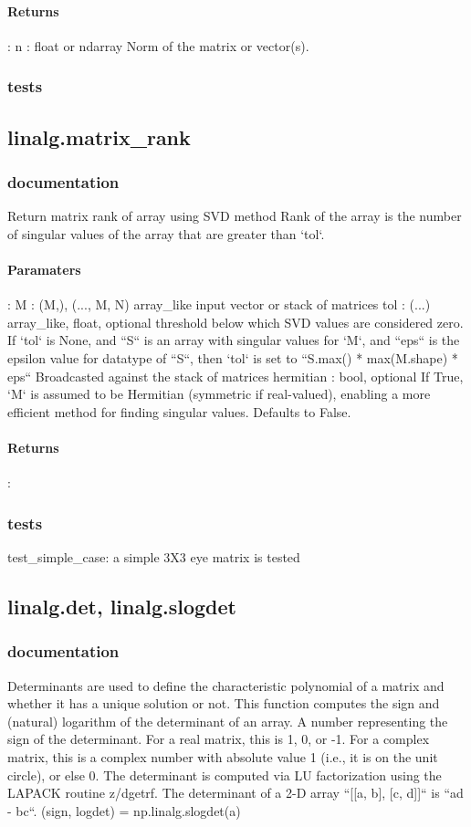 \paragraph{Returns}:    
n : float or ndarray
Norm of the matrix or vector(s).\\

\subsubsection{tests}


\subsection{linalg.matrix\_rank}
\subsubsection{documentation}
Return matrix rank of array using SVD method
Rank of the array is the number of singular values of the array that are
greater than `tol`.
\paragraph{Paramaters}:  M : {(M,), (..., M, N)} array\_like input vector or stack of matrices
tol : (...) array\_like, float, optional
threshold below which SVD values are considered zero. If `tol` is None, and ``S`` is an array with singular values for `M`, and ``eps`` is the epsilon value for datatype of ``S``, then `tol` is set to ``S.max() * max(M.shape) * eps`` Broadcasted against the stack of matrices hermitian : bool, optional If True, `M` is assumed to be Hermitian (symmetric if real-valued),
enabling a more efficient method for finding singular values. Defaults to False.
\paragraph{Returns}: 
\subsubsection{tests}
test\_simple\_case: a simple 3X3 eye matrix is tested 


\subsection{linalg.det, linalg.slogdet}
\subsubsection{documentation}
Determinants are used to define the characteristic polynomial of a matrix and whether it has a unique solution or not. This function computes the sign and (natural) logarithm of the determinant of an array. A number representing the sign of the determinant. For a real matrix,
this is 1, 0, or -1. For a complex matrix, this is a complex number with absolute value 1 (i.e., it is on the unit circle), or else 0. The determinant is computed via LU factorization using the LAPACK
routine z/dgetrf. The determinant of a 2-D array ``[[a, b], [c, d]]`` is ``ad - bc``. (sign, logdet) = np.linalg.slogdet(a)
